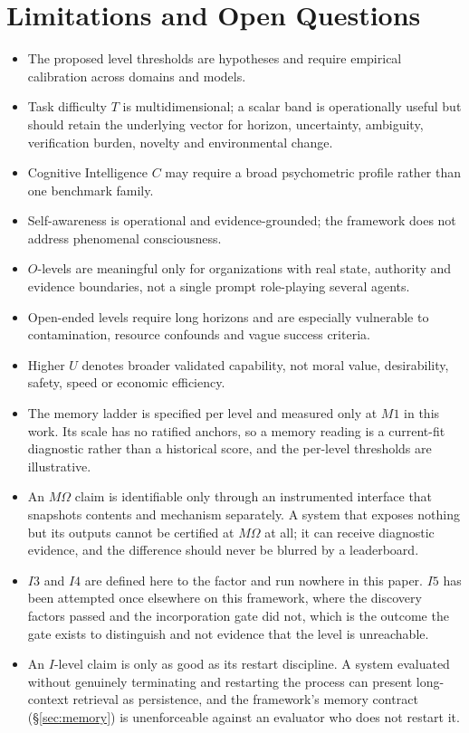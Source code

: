 \documentclass[11pt]{article}
\theoremstyle{definition}
\newcommand{\Om}{\ensuremath{\Omega}}
\begin{document}
\section{Limitations and Open Questions}\label{sec:limitations}

\begin{itemize}
\item The proposed level thresholds are hypotheses and require empirical calibration across domains and models.
\item Task difficulty $T$ is multidimensional; a scalar band is operationally useful but should retain the underlying vector for horizon, uncertainty, ambiguity, verification burden, novelty and environmental change.
\item Cognitive Intelligence $C$ may require a broad psychometric profile rather than one benchmark family.
\item Self-awareness is operational and evidence-grounded; the framework does not address phenomenal consciousness.
\item $O$-levels are meaningful only for organizations with real state, authority and evidence boundaries, not a single prompt role-playing several agents.
\item Open-ended levels require long horizons and are especially vulnerable to contamination, resource confounds and vague success criteria.
\item Higher $U$ denotes broader validated capability, not moral value, desirability, safety, speed or economic efficiency.
\item The memory ladder is specified per level and measured only at $M1$ in this work. Its scale has no ratified anchors, so a memory reading is a current-fit diagnostic rather than a historical score, and the per-level thresholds are illustrative.
\item An $M\Om{}$ claim is identifiable only through an instrumented interface that snapshots contents and mechanism separately. A system that exposes nothing but its outputs cannot be certified at $M\Om{}$ at all; it can receive diagnostic evidence, and the difference should never be blurred by a leaderboard.
\item $I3$ and $I4$ are defined here to the factor and run nowhere in this paper. $I5$ has been attempted once elsewhere on this framework, where the discovery factors passed and the incorporation gate did not, which is the outcome the gate exists to distinguish and not evidence that the level is unreachable.
\item An $I$-level claim is only as good as its restart discipline. A system evaluated without genuinely terminating and restarting the process can present long-context retrieval as persistence, and the framework's memory contract (\S\ref{sec:memory}) is unenforceable against an evaluator who does not restart it.
\end{itemize}
\end{document}
